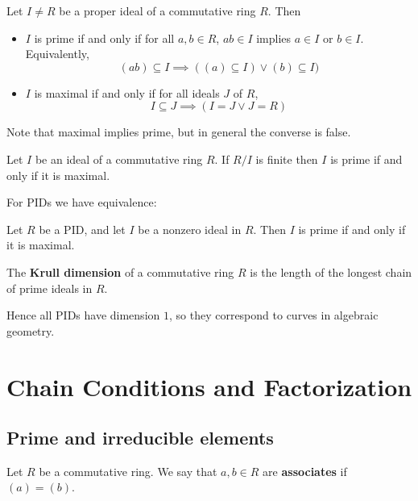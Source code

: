 \documentclass[12pt, a4paper, oneside, openright, titlepage]{book}
\begin{document}
\begin{prop}
    Let $I \neq R$ be a proper ideal of a commutative ring $R$. Then \begin{itemize}
        \item $I$ is prime if and only if for all $a,b \in R$, $ab \in I$ implies $a \in I$ or $b \in I$. Equivalently, \begin{equation*}
                (ab) \subseteq I\implies ((a) \subseteq I)\lor (b) \subseteq I)
        \end{equation*}
        \item $I$ is maximal if and only if for all ideals $J$ of $R$, \begin{equation*}
                I \subseteq J\implies (I = J\lor J = R)
        \end{equation*}
    \end{itemize}
\end{prop}


Note that maximal implies prime, but in general the converse is false.

\begin{prop}
    Let $I$ be an ideal of a commutative ring $R$. If $R/I$ is finite then $I$ is prime if and only if it is maximal.
\end{prop}

For PIDs we have equivalence:

\begin{prop}
    Let $R$ be a PID, and let $I$ be a nonzero ideal in $R$. Then $I$ is prime if and only if it is maximal.
\end{prop}

\begin{defn}
    The \textbf{Krull dimension} of a commutative ring $R$ is the length of the longest chain of prime ideals in $R$.
\end{defn}

Hence all PIDs have dimension $1$, so they correspond to curves in algebraic geometry.


\chapter{Chain Conditions and Factorization}

\section{Prime and irreducible elements}

Let $R$ be a commutative ring. We say that $a,b \in R$ are \textbf{associates} if $(a) = (b)$.
\end{document}
